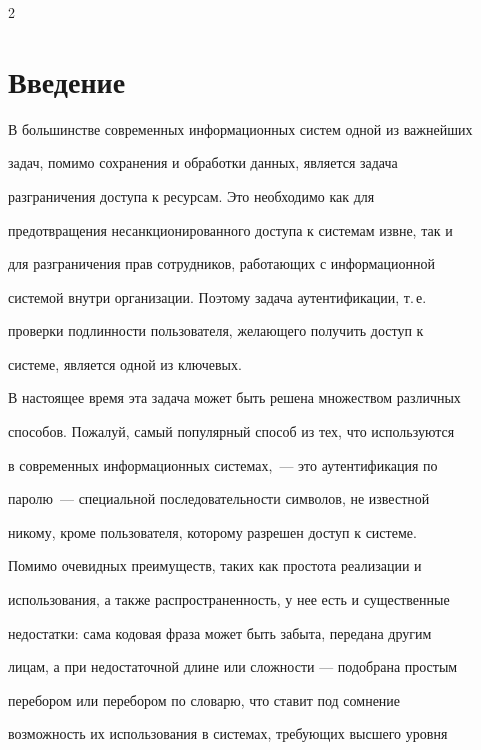       \begin{multicols}{2}



            \label{st\stat}

            



            

\section{Введение}



В большинстве современных информационных систем одной из важнейших

задач, помимо сохранения и обработки данных, является задача

разграничения доступа к ресурсам. Это необходимо как для

предотвращения несанкционированного доступа к сис\-те\-мам извне, так и

для разграничения прав сотрудников, работающих с информационной

сис\-те\-мой внутри организации. Поэтому задача аутентификации, т.\,е.\

проверки подлинности пользователя, желающего получить доступ к

системе, является одной из ключевых.



В настоящее время эта задача может быть решена множеством различных

способов. Пожалуй, самый популярный способ из тех, что используются

в современных информационных системах,~--- это аутентификация по

паролю~--- специальной последовательности символов, не известной

никому, кроме пользователя, которому разрешен доступ к системе.

Помимо очевидных преимуществ, таких как простота реализации и

использования, а также распространенность, у нее есть и существенные

недостатки: сама кодовая фраза может быть забыта, передана другим

лицам, а при недостаточной длине или сложности --- подобрана простым

перебором или перебором по словарю, что ставит под сомнение

возможность их использования в системах, требующих высшего уровня


\end{multicols}
